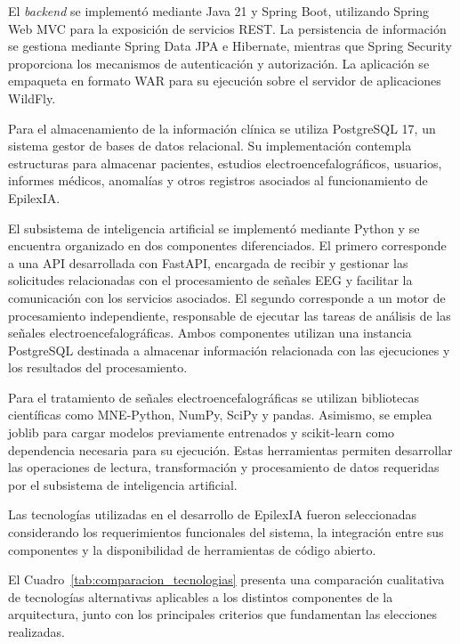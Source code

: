 El \textit{backend} se implementó mediante Java 21 y Spring Boot, utilizando
Spring Web MVC para la exposición de servicios REST. La persistencia
de información se gestiona mediante Spring Data JPA e Hibernate,
mientras que Spring Security proporciona los mecanismos de
autenticación y autorización. La aplicación se empaqueta en formato
WAR para su ejecución sobre el servidor de aplicaciones WildFly.

Para el almacenamiento de la información clínica se utiliza
PostgreSQL 17, un sistema gestor de bases de datos relacional. Su
implementación contempla estructuras para almacenar pacientes,
estudios electroencefalográficos, usuarios, informes médicos,
anomalías y otros registros asociados al funcionamiento de EpilexIA.

El subsistema de inteligencia artificial se implementó mediante
Python y se encuentra organizado en dos componentes diferenciados.
El primero corresponde a una API desarrollada con FastAPI, encargada de recibir y gestionar las solicitudes relacionadas con el procesamiento de señales EEG y facilitar la comunicación con los servicios asociados. El segundo corresponde a un motor de procesamiento independiente, responsable de ejecutar las tareas de análisis de las señales electroencefalográficas. Ambos componentes utilizan una instancia PostgreSQL destinada a almacenar información relacionada con las ejecuciones y los resultados del procesamiento.


Para el tratamiento de señales electroencefalográficas se utilizan
bibliotecas científicas como MNE-Python, NumPy, SciPy y pandas.
Asimismo, se emplea joblib para cargar modelos previamente
entrenados y scikit-learn como dependencia necesaria para su
ejecución. Estas herramientas permiten desarrollar las operaciones
de lectura, transformación y procesamiento de datos requeridas
por el subsistema de inteligencia artificial.

Las tecnologías utilizadas en el desarrollo de EpilexIA
fueron seleccionadas considerando los requerimientos
funcionales del sistema, la integración entre sus
componentes y la disponibilidad de herramientas
de código abierto.

El Cuadro~\ref{tab:comparacion_tecnologias} presenta
una comparación cualitativa de tecnologías alternativas
aplicables a los distintos componentes de la arquitectura,
junto con los principales criterios que fundamentan
las elecciones realizadas.

